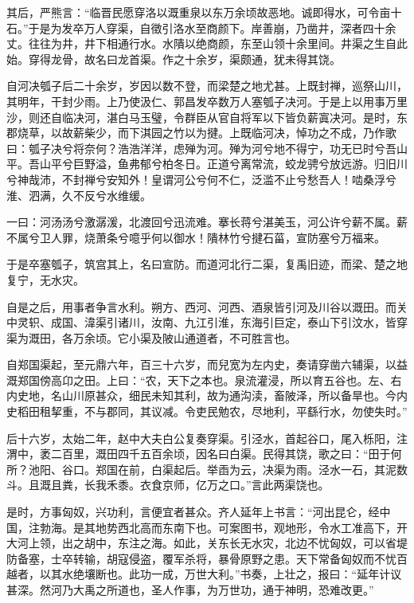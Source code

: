 \documentclass[12pt,UTF8]{ctexbook}
\begin{document}
其后，严熊言：“临晋民愿穿洛以溉重泉以东万余顷故恶地。诚即得水，可令亩十石。”于是为发卒万人穿渠，自徵引洛水至商颜下。岸善崩，乃凿井，深者四十余丈。往往为井，井下相通行水。水隤以绝商颜，东至山领十余里间。井渠之生自此始。穿得龙骨，故名曰龙首渠。作之十余岁，渠颇通，犹未得其饶。



自河决瓠子后二十余岁，岁因以数不登，而梁楚之地尤甚。上既封禅，巡祭山川，其明年，干封少雨。上乃使汲仁、郭昌发卒数万人塞瓠子决河。于是上以用事万里沙，则还自临决河，湛白马玉璧，令群臣从官自将军以下皆负薪寘决河。是时，东郡烧草，以故薪柴少，而下淇园之竹以为揵。上既临河决，悼功之不成，乃作歌曰：瓠子决兮将奈何？浩浩洋洋，虑殚为河。殚为河兮地不得宁，功无已时兮吾山平。吾山平兮巨野溢，鱼弗郁兮柏冬日。正道兮离常流，蛟龙骋兮放远游。归旧川兮神哉沛，不封禅兮安知外！皇谓河公兮何不仁，泛滥不止兮愁吾人！啮桑浮兮淮、泗满，久不反兮水维缓。



一曰：河汤汤兮激潺湲，北渡回兮迅流难。搴长蒋兮湛美玉，河公许兮薪不属。薪不属兮卫人罪，烧萧条兮噫乎何以御水！隤林竹兮揵石菑，宣防塞兮万福来。



于是卒塞瓠子，筑宫其上，名曰宣防。而道河北行二渠，复禹旧迹，而梁、楚之地复宁，无水灾。



自是之后，用事者争言水利。朔方、西河、河西、酒泉皆引河及川谷以溉田。而关中灵轵、成国、湋渠引诸川，汝南、九江引淮，东海引巨定，泰山下引汶水，皆穿渠为溉田，各万余顷。它小渠及陂山通道者，不可胜言也。



自郑国渠起，至元鼎六年，百三十六岁，而兒宽为左内史，奏请穿凿六辅渠，以益溉郑国傍高卬之田。上曰：“农，天下之本也。泉流灌浸，所以育五谷也。左、右内史地，名山川原甚众，细民未知其利，故为通沟渎，畜陂泽，所以备旱也。今内史稻田租挈重，不与郡同，其议减。令吏民勉农，尽地利，平繇行水，勿使失时。”



后十六岁，太始二年，赵中大夫白公复奏穿渠。引泾水，首起谷口，尾入栎阳，注渭中，袤二百里，溉田四千五百余顷，因名曰白渠。民得其饶，歌之曰：“田于何所？池阳、谷口。郑国在前，白渠起后。举臿为云，决渠为雨。泾水一石，其泥数斗。且溉且粪，长我禾黍。衣食京师，亿万之口。”言此两渠饶也。



是时，方事匈奴，兴功利，言便宜者甚众。齐人延年上书言：“河出昆仑，经中国，注勃海。是其地势西北高而东南下也。可案图书，观地形，令水工准高下，开大河上领，出之胡中，东注之海。如此，关东长无水灾，北边不忧匈奴，可以省堤防备塞，士卒转输，胡寇侵盗，覆军杀将，暴骨原野之患。天下常备匈奴而不忧百越者，以其水绝壤断也。此功一成，万世大利。”书奏，上壮之，报曰：“延年计议甚深。然河乃大禹之所道也，圣人作事，为万世功，通于神明，恐难改更。”
\end{document}
